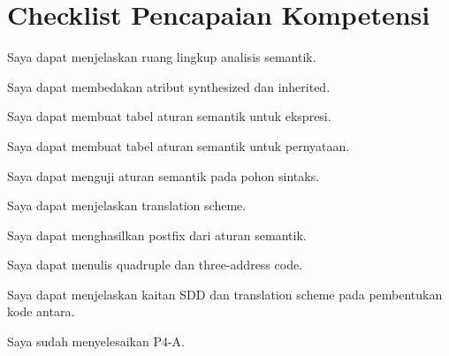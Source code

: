 \section*{Checklist Pencapaian Kompetensi}

\begin{checklist}
  \item Saya dapat menjelaskan ruang lingkup analisis semantik.
  \item Saya dapat membedakan atribut synthesized dan inherited.
  \item Saya dapat membuat tabel aturan semantik untuk ekspresi.
  \item Saya dapat membuat tabel aturan semantik untuk pernyataan.
  \item Saya dapat menguji aturan semantik pada pohon sintaks.
  \item Saya dapat menjelaskan translation scheme.
  \item Saya dapat menghasilkan postfix dari aturan semantik.
  \item Saya dapat menulis quadruple dan three-address code.
  \item Saya dapat menjelaskan kaitan SDD dan translation scheme pada
        pembentukan kode antara.
  \item Saya sudah menyelesaikan P4-A.
\end{checklist}

